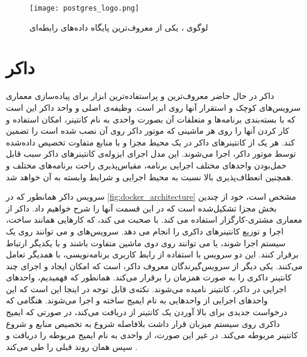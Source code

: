 \begin{figure}[!h]
\centerline{\texttt{[image: postgres\_logo.png]}}
\caption{لوگوی ، یکی از معروف‌ترین پایگاه داده‌های رابطه‌ای\cite{postgresqlPostgreSQL}}
\label{fig:postgres_logo}
\end{figure}

\section{داکر}
داکر در حال حاضر معروف‌ترین و پراستفاده‌ترین ابزار برای پیاده‌سازی معماری سرویس‌های کوچک و استقرار آنها روی ابر است.  وظیفه‌ی اصلی و واحد داکر این است که با بسته‌بندی برنامه‌ها و متعلقات آن بصورت واحدی به نام کانتینر، امکان استفاده و کار کردن آنها را روی هر ماشینی که موتور داکر روی آن نصب شده است را تضمین کند. هر یک از کانتینرهای داکر در یک محیط مجزا و با منابع متفاوت تخصیص داده‌شده توسط موتور داکر، اجرا می‌شوند. این مدل اجرای ایزوله‌ی کانتینرهای داکر سبب قابل حمل‌بودن واحدهای مختلف اجرایی برنامه، مقیاس‌پذیری راحت برنامه‌های مختلف و همچنین انعطاف‌پذیری بالا نسبت به محیط اجرایی و شرایط وابسته به آن خواهد شد\cite{anderson2015docker, dockerDockerOverview}.

سرویس داکر همانطور که در \cref{fig:docker_architecture}\cite{dockerDockerOverview} مشخص است، خود از چندین بخش مجزا تشکیل‌شده است که در این قسمت آنها را شرح 
خواهیم داد. داکر از معماری مشتری-کارگزار استفاده می کند.  با  صحبت می کند، که کارهایی همانند ساخت، اجرا و توزیع کانتینرهای داکری را انجام می دهد. سرویس‌های  و  می توانند روی یک سیستم اجرا شوند، یا می توانند روی دوی ماشین متفاوت باشند و با یکدیگر ارتباط برقرار کنند. این دو سرویس با استفاده از رابط کاربری برنامه‌نویسی، با همدیگر تعامل می‌کنند. یکی دیگر از سرویس‌گیرندگان معروف داکر،  است که امکان ایجاد و اجرای چند کانتینر داکری را به صورت همزمان را برقرار می‌کند. همانطور که فهمیدیم، واحد‌های اجرایی در داکر، کانتینر نامیده می‌شوند. نکته‌ی قابل توجه در اینجا این است که این واحد‌های اجرایی از واحد‌هایی به نام ایمیج ساخته و اجرا می‌شوند. هنگامی که  درخواست جدیدی برای بالا آوردن یک کانتینر از  دریافت می‌کند، در صورتی که ایمیج داکری روی سیستم میزبان قرار داشت بلافاصله شروع به تخصیص منابع و شروع کانتینر مربوطه می‌کند. در غیر این صورت، از واحدی به نام  ایمیج مربوطه را دریافت و سپس همان روند قبلی را طی می‌کند \cite{dockerDockerOverview}.

